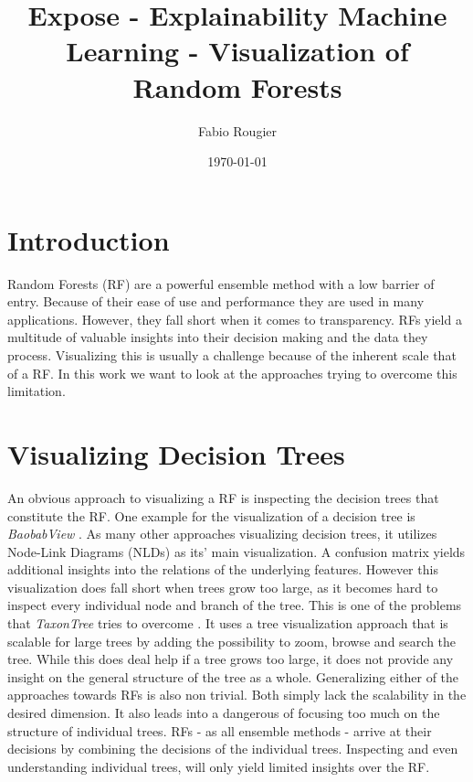 \documentclass[a4paper, 12pt]{article}
\title{Expose - Explainability Machine Learning - Visualization of Random Forests}
\author{Fabio Rougier}
\date{\today}
\begin{document}
\maketitle

\tableofcontents
\clearpage
\section{Introduction}
Random Forests (RF) are a powerful ensemble method with a low barrier of entry. Because of their
ease of use and performance they are used in many applications. However, they fall short
when it comes to transparency.
RFs yield a multitude of valuable insights into their decision making and the data they
process. Visualizing this is usually a challenge because of the inherent scale that of a RF. 
In this work we want to look at the approaches trying to overcome this limitation.

\section{Visualizing Decision Trees}
An obvious approach to visualizing a RF is inspecting the decision trees that constitute
the RF. One example for the visualization of a decision tree is \textit{BaobabView}
\cite{van2011baobabview}. As many other approaches visualizing decision trees, it utilizes
Node-Link Diagrams (NLDs) as its' main visualization. A confusion matrix yields additional
insights into the relations of the underlying features.
However this visualization does fall short when trees grow too large, as it becomes hard to
inspect every individual node and branch of the tree.
This is one of the problems that \textit{TaxonTree} tries to overcome 
\cite{parr2003taxontree}. It uses a tree visualization approach that is scalable for large 
trees by adding the possibility to zoom, browse and search the tree. While this does deal
help if a tree grows too large, it does not provide any insight on the general structure of
the tree as a whole.
\linebreak
\linebreak
Generalizing either of the approaches towards RFs is also non trivial. Both simply lack the
scalability in the desired dimension. It also leads into a dangerous of focusing too much on
the structure of individual trees. RFs - as all ensemble methods - arrive at their decisions
by combining the decisions of the individual trees. Inspecting and even understanding
individual trees, will only yield limited insights over the RF.
\end{document}
